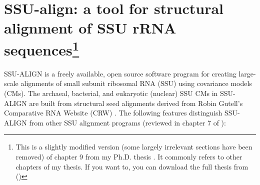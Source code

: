 \section[SSU-align: a tool for structural alignment of SSU
  rRNA sequences\protect\footnote{This is a slightly modified version 
  of chapter 9 from my Ph.D. thesis \cite{Nawrocki09b}}]
  {SSU-align: a tool for structural alignment of SSU
  rRNA sequences\protect\footnote{This is a slightly modified version
  (some largely irrelevant sections have been removed) 
  of chapter 9 from my Ph.D. thesis \cite{Nawrocki09b}. It commonly refers to other
  chapters of my thesis. If you want to, you can download the full thesis from 
  ()}}
\label{section:chap9}

SSU-ALIGN is a freely available, open source software program
for creating large-scale alignments of small subunit ribosomal RNA
(SSU) using covariance models (CMs). The archaeal, bacterial,
and eukaryotic (nuclear) 
SSU CMs in SSU-ALIGN are built from structural seed alignments derived from
Robin Gutell's Comparative RNA Website (CRW) \cite{CannoneGutell02}.
The following features distinguish SSU-ALIGN from other
SSU alignment programs (reviewed in chapter 7 of \cite{Nawrocki09b}):

